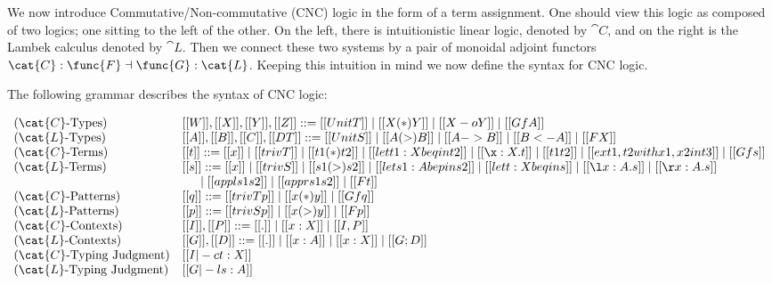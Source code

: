 We now introduce Commutative/Non-commutative (CNC) logic in the form
of a term assignment.  One should view this logic as composed of two
logics; one sitting to the left of the other.  On the left, there is
intuitionistic linear logic, denoted by $\cat{C}$, and on the right is
the Lambek calculus denoted by $\cat{L}$.  Then we connect these two
systems by a pair of monoidal adjoint functors $\cat{C} : \func{F}
\dashv \func{G} : \cat{L}$.  Keeping this intuition in mind we now
define the syntax for CNC logic.
\begin{definition}
  \label{def:Lambek-syntax}
  The following grammar describes the syntax of CNC logic:
  \begin{center}\vspace{-5px}
    \begin{math}
      \begin{array}{lll}        
        \text{($\cat{C}$-Types)} & [[W]],[[X]],[[Y]],[[Z]] ::= [[UnitT]] \mid [[X (*) Y]] \mid [[X -o Y]] \mid [[Gf A]]\\
        \text{($\cat{L}$-Types)} & [[A]],[[B]],[[C]],[[DT]] ::= [[UnitS]] \mid [[A (>) B]] \mid [[A -> B]] \mid [[B <- A]] \mid [[F X]]\\        
        \text{($\cat{C}$-Terms)} & [[t]] ::= [[x]] \mid [[trivT]] \mid [[t1 (*) t2]] \mid [[let t1 : X be q in t2]] \mid [[\x:X.t]] \mid [[t1 t2]] \mid [[ex t1 , t2 with x1 , x2 in t3]] \mid [[Gf s]]\\
        \text{($\cat{L}$-Terms)} & [[s]] ::= [[x]] \mid [[trivS]] \mid [[s1 (>) s2]] \mid [[let s1 : A be p in s2]] \mid [[let t : X be q in s]] \mid [[\l x : A.s]] \mid [[\r x : A . s]] \\
        & \,\,\,\,\,\,\,\,\,\mid [[appl s1 s2]] \mid [[appr s1 s2]] \mid [[F t]]\\        
        \text{($\cat{C}$-Patterns)} & [[q]] ::= [[trivTp]] \mid [[x (*) y]] \mid [[Gf q]]\\
        \text{($\cat{L}$-Patterns)} & [[p]] ::= [[trivSp]] \mid [[x (>) y]] \mid [[F p]]\\        
        \text{($\cat{C}$-Contexts)} & [[I]],[[P]] ::= [[.]] \mid [[x : X]] \mid [[I,P]]\\
        \text{($\cat{L}$-Contexts)} & [[G]],[[D]] ::= [[.]] \mid [[x : A]] \mid [[x : X]] \mid [[G;D]]\\        
        \text{($\cat{C}$-Typing Judgment)} & [[I |-c t : X]]\\
        \text{($\cat{L}$-Typing Judgment)} & [[G |-l s : A]]\\
      \end{array}
    \end{math}
  \end{center}
\end{definition}

